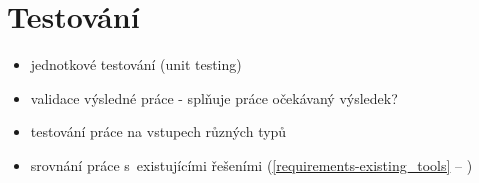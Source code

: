 \chapter{Testování}


\begin{itemize}
\item jednotkové testování (unit testing)
\item validace výsledné práce - splňuje práce očekávaný výsledek?
\item testování práce na vstupech různých typů
\item srovnání práce s~existujícími řešeními (\ref{requirements-existing_tools} -- )
\end{itemize}

